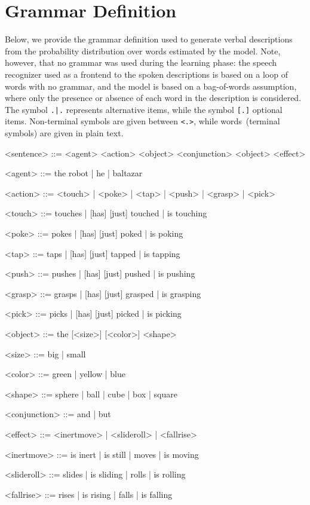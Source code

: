 \section{Grammar Definition}
\label{appendix:grammar}
Below, we provide the grammar definition used to generate verbal descriptions from the probability distribution over words estimated by the model.
Note, however, that no grammar was used during the learning phase: the speech recognizer used as a frontend to the spoken descriptions is based on a loop of words with no grammar, and the \AffWords{} model is based on a bag-of-words assumption, where only the presence or absence of each word in the description is considered.
The symbol \texttt{.|.} represents alternative items, while the symbol \texttt{[.]} optional items.
Non-terminal symbols are given between \texttt{<.>}, while words~(terminal symbols) are given in plain text.


\begin{grammar}
  <sentence> ::= <agent> <action> <object> <conjunction> <object> <effect>

  <agent> ::= the robot | he | baltazar

  <action> ::= <touch> | <poke> | <tap> | <push> | <grasp> | <pick>

  <touch> ::= touches | [has] [just] touched | is touching

  <poke> ::= pokes | [has] [just] poked | is poking

  <tap> ::= taps | [has] [just] tapped | is tapping

  <push> ::= pushes | [has] [just] pushed | is pushing

  <grasp> ::= grasps | [has] [just] grasped | is grasping

  <pick> ::= picks | [has] [just] picked | is picking

  <object> ::= the [<size>] [<color>] <shape>

  <size> ::= big | small

  <color> ::= green | yellow | blue

  <shape> ::= sphere | ball | cube | box | square

  <conjunction> ::= and | but

  <effect> ::= <inertmove> | <slideroll> | <fallrise>

  <inertmove> ::= is inert | is still | moves | is moving

  <slideroll> ::= slides | is sliding | rolls | is rolling

  <fallrise> ::= rises | is rising | falls | is falling
\end{grammar}
